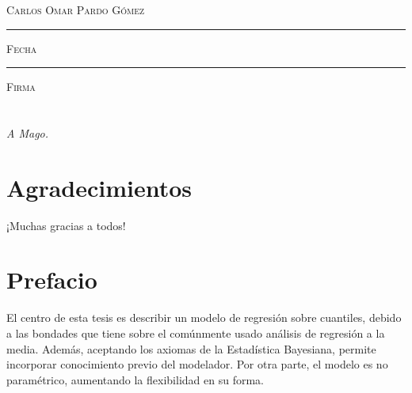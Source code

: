 \documentclass[letterpaper,onside,11pt,review,usenames,dvipsnames]{report}
\begin{document}
\centering

\hspace{3em}

\textsc{Carlos Omar Pardo G\'omez}

\vspace{4em}

\rule[1em]{20em}{0.5pt} %

\textsc{Fecha}
 
\vspace{6em}

\rule[1em]{20em}{0.5pt} %

\textsc{Firma}

\endgroup
\vspace*{\fill}

\pagestyle{empty}
\frontmatter

\chapter*{}
\begin{flushright}
\textit{A Mago.}
\end{flushright}


\chapter*{Agradecimientos}
¡Muchas gracias a todos!


\pagestyle{plain}
\chapter*{Prefacio}


El centro de esta tesis es describir un modelo de regresi\'on sobre cuantiles, debido a las bondades que tiene sobre el com\'unmente usado an\'alisis de regresi\'on a la media. Adem\'as, aceptando los axiomas de la Estad\'istica Bayesiana, permite incorporar conocimiento previo del modelador. Por otra parte, el modelo es no param\'etrico, aumentando la flexibilidad en su forma.
\end{document}
